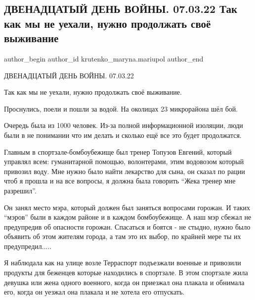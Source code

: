  
 
 
 
 

\subsection{ДВЕНАДЦАТЫЙ ДЕНЬ ВОЙНЫ. 07.03.22 Так как мы не уехали, нужно продолжать своё выживание}
\label{sec:07_03_2023.fb.krutenko_maryna.mariupol.1.12_den_07_03_vyzhyvanie_prodolzhat}

\ifcmt
 author_begin
   author_id krutenko_maryna.mariupol
 author_end
\fi

ДВЕНАДЦАТЫЙ ДЕНЬ ВОЙНЫ. 07.03.22

Так как мы не уехали, нужно продолжать своё выживание. 

Проснулись, поели и пошли за водой. На околицах 23 микрорайона шёл бой. 

Очередь была из 1000 человек. Из-за полной информационной изоляции, люди были в
не понимании что им делать и сколько ещё все это будет продолжатся. 

Главным в спортзале-бомбоубежище был тренер Топузов Евгений, который управлял
всем: гуманитарной помощью, волонтерами, этим водовозом который привозил воду.
Мне нужно было найти лекарство для сына, он сказал по рации чтоб я прошла и на
все вопросы, я должна была говорить \enquote{Жека тренер мне разрешил}.

Он занял место мэра, который должен был заняться вопросами горожан. И таких
\enquote{мэров} были в каждом районе и в каждом бомбоубежище. А наш мэр сбежал не
предупредив об опасности горожан. Спасаться и боятся - не стыдно, нужно было
объявить об этом жителям города, а там это их выбор, по крайней мере ты их
предупредил.....

Я наблюдала как на улице возле Терраспорт подъезжали военные и привозили
продукты для беженцев которые находились в спортзале. В этом спортзале жила
девушка или жена одного военного, когда он приезжал она плакала и обнимала его,
когда он уезжал она плакала и не хотела его отпускать. 

